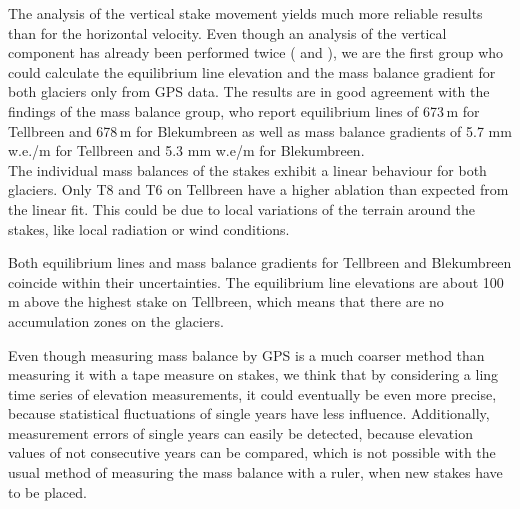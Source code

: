 The analysis of the vertical stake movement yields much more reliable results than for the horizontal velocity.
Even though an analysis of the vertical component has already been performed twice
(\cite{rep2016} and \cite{rep2017}),
we are the first group who could calculate the equilibrium line elevation and the mass balance gradient for
both glaciers only from GPS data.
The results are in good agreement with the findings of the mass balance group, who report equilibrium lines of
673\,m for Tellbreen and 678\,m for Blekumbreen as well as
mass balance gradients of 5.7 mm w.e./m for Tellbreen and 5.3 mm w.e/m for Blekumbreen.\\
The individual mass balances of the stakes exhibit a linear behaviour for both glaciers.
Only T8 and T6 on Tellbreen have a higher ablation than expected from the linear fit.
This could be due to local variations of the terrain around the stakes,
like local radiation or wind conditions.

Both equilibrium lines and mass balance gradients for Tellbreen and Blekumbreen coincide within their uncertainties.
The equilibrium line elevations are about 100\,m above the highest stake on Tellbreen,
which means that there are no accumulation zones on the glaciers.

Even though measuring mass balance by GPS is a much coarser method than measuring it with a tape measure on stakes,
we think that by considering a ling time series of elevation measurements,
it could eventually be even more precise,
because statistical fluctuations of single years have less influence.
Additionally, measurement errors of single years can easily be detected,
because elevation values of not consecutive years can be compared,
which is not possible with the usual method of measuring the mass balance with a ruler,
when new stakes have to be placed.


